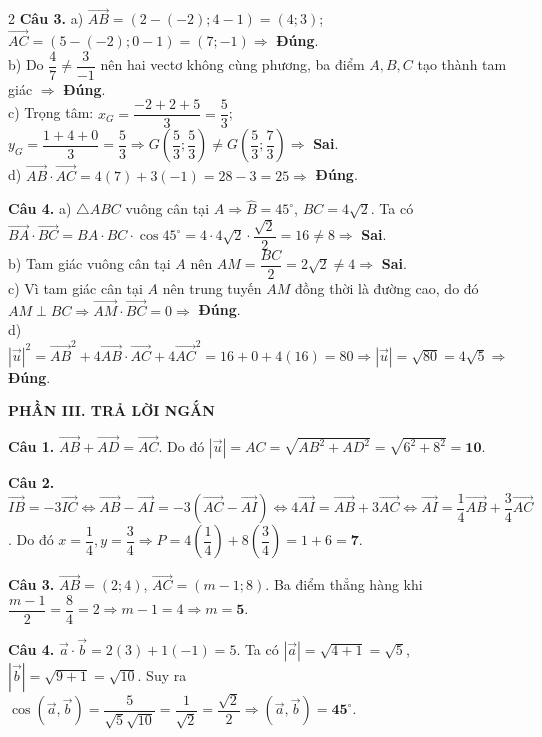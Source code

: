 \documentclass[10pt,a4paper]{article}
\begin{document}
\begin{multicols}{2}
\textbf{Câu 3.}
a) $\vec{AB} = (2 - (-2); 4 - 1) = (4; 3)$; $\vec{AC} = (5 - (-2); 0 - 1) = (7; -1) \Rightarrow$ \textbf{Đúng}.\\
b) Do $\dfrac{4}{7} \ne \dfrac{3}{-1}$ nên hai vectơ không cùng phương, ba điểm $A, B, C$ tạo thành tam giác $\Rightarrow$ \textbf{Đúng}.\\
c) Trọng tâm: $x_G = \dfrac{-2+2+5}{3} = \dfrac{5}{3}$; $y_G = \dfrac{1+4+0}{3} = \dfrac{5}{3} \Rightarrow G\left(\dfrac{5}{3}; \dfrac{5}{3}\right) \ne G\left(\dfrac{5}{3}; \dfrac{7}{3}\right) \Rightarrow$ \textbf{Sai}.\\
d) $\vec{AB} \cdot \vec{AC} = 4(7) + 3(-1) = 28 - 3 = 25 \Rightarrow$ \textbf{Đúng}.

\textbf{Câu 4.}
a) $\triangle ABC$ vuông cân tại $A \Rightarrow \widehat{B} = 45^\circ$, $BC = 4\sqrt{2}$. Ta có $\vec{BA} \cdot \vec{BC} = BA \cdot BC \cdot \cos 45^\circ = 4 \cdot 4\sqrt{2} \cdot \dfrac{\sqrt{2}}{2} = 16 \ne 8 \Rightarrow$ \textbf{Sai}.\\
b) Tam giác vuông cân tại $A$ nên $AM = \dfrac{BC}{2} = 2\sqrt{2} \ne 4 \Rightarrow$ \textbf{Sai}.\\
c) Vì tam giác cân tại $A$ nên trung tuyến $AM$ đồng thời là đường cao, do đó $AM \perp BC \Rightarrow \vec{AM} \cdot \vec{BC} = 0 \Rightarrow$ \textbf{Đúng}.\\
d) $|\vec{u}|^2 = \vec{AB}^2 + 4\vec{AB}\cdot\vec{AC} + 4\vec{AC}^2 = 16 + 0 + 4(16) = 80 \Rightarrow |\vec{u}| = \sqrt{80} = 4\sqrt{5} \Rightarrow$ \textbf{Đúng}.

\textbf{\color{accent}PHẦN III. TRẢ LỜI NGẮN}

\textbf{Câu 1.} $\vec{AB} + \vec{AD} = \vec{AC}$. Do đó $|\vec{u}| = AC = \sqrt{AB^2 + AD^2} = \sqrt{6^2 + 8^2} = \mathbf{10}$.

\textbf{Câu 2.} $\vec{IB} = -3\vec{IC} \Leftrightarrow \vec{AB} - \vec{AI} = -3(\vec{AC} - \vec{AI}) \Leftrightarrow 4\vec{AI} = \vec{AB} + 3\vec{AC} \Leftrightarrow \vec{AI} = \dfrac{1}{4}\vec{AB} + \dfrac{3}{4}\vec{AC}$. Do đó $x = \dfrac{1}{4}, y = \dfrac{3}{4} \Rightarrow P = 4\left(\dfrac{1}{4}\right) + 8\left(\dfrac{3}{4}\right) = 1 + 6 = \mathbf{7}$.

\textbf{Câu 3.} $\vec{AB} = (2; 4)$, $\vec{AC} = (m - 1; 8)$. Ba điểm thẳng hàng khi $\dfrac{m - 1}{2} = \dfrac{8}{4} = 2 \Rightarrow m - 1 = 4 \Rightarrow m = \mathbf{5}$.

\textbf{Câu 4.} $\vec{a} \cdot \vec{b} = 2(3) + 1(-1) = 5$. Ta có $|\vec{a}| = \sqrt{4+1} = \sqrt{5}$, $|\vec{b}| = \sqrt{9+1} = \sqrt{10}$. Suy ra $\cos(\vec{a}, \vec{b}) = \dfrac{5}{\sqrt{5}\sqrt{10}} = \dfrac{1}{\sqrt{2}} = \dfrac{\sqrt{2}}{2} \Rightarrow (\vec{a}, \vec{b}) = \mathbf{45}^\circ$.


\end{multicols}
\end{document}
